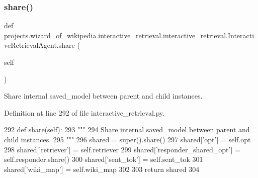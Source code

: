 \mbox{\label{classprojects_1_1wizard__of__wikipedia_1_1interactive__retrieval_1_1interactive__retrieval_1_1InteractiveRetrievalAgent_a93125f9d9285d48730fda4545b642f00}} 
\subsubsection{\texorpdfstring{share()}{share()}}
{\footnotesize\ttfamily def projects.\+wizard\+\_\+of\+\_\+wikipedia.\+interactive\+\_\+retrieval.\+interactive\+\_\+retrieval.\+Interactive\+Retrieval\+Agent.\+share (\begin{DoxyParamCaption}\item[{}]{self }\end{DoxyParamCaption})}

\begin{DoxyVerb}Share internal saved_model between parent and child instances.
\end{DoxyVerb}
 

Definition at line 292 of file interactive\+\_\+retrieval.\+py.


\begin{DoxyCode}
292     \textcolor{keyword}{def }share(self):
293         \textcolor{stringliteral}{"""}
294 \textcolor{stringliteral}{        Share internal saved\_model between parent and child instances.}
295 \textcolor{stringliteral}{        """}
296         shared = super().share()
297         shared[\textcolor{stringliteral}{'opt'}] = self.opt
298         shared[\textcolor{stringliteral}{'retriever'}] = self.retriever
299         shared[\textcolor{stringliteral}{'responder\_shared\_opt'}] = self.responder.share()
300         shared[\textcolor{stringliteral}{'sent\_tok'}] = self.sent\_tok
301         shared[\textcolor{stringliteral}{'wiki\_map'}] = self.wiki\_map
302 
303         \textcolor{keywordflow}{return} shared
304 \end{DoxyCode}


